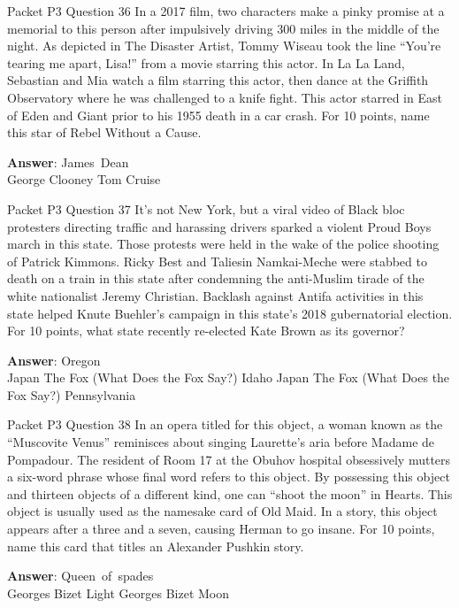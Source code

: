 \begin{frame}{Packet P3 Question 36}
In a 2017 film, two characters make a pinky promise at a memorial to this person after impulsively driving 300 miles in the middle of the night. As depicted in The Disaster Artist, Tommy Wiseau took the line “You’re tearing me apart, Lisa!” from a movie starring this actor. In La La Land, Sebastian and Mia watch a film starring this actor, then dance at the Griffith Observatory where he was challenged to a knife fight. This actor starred in East of Eden and Giant prior to his 1955 death in a car crash. For 10 points, name this star of Rebel Without a Cause.        

\textbf{Answer}: James\ Dean\\
 George Clooney
 Tom Cruise
\end{frame}

\begin{frame}{Packet P3 Question 37}
It's not New York, but   a viral video of Black   bloc protesters directing traffic and harassing drivers sparked a violent Proud Boys march in this state. Those protests were held in the wake of the police shooting of Patrick Kimmons. Ricky Best and Taliesin Namkai-Meche were stabbed to death on a train in this state after condemning the anti-Muslim tirade of the white nationalist Jeremy Christian. Backlash against Antifa activities in this state helped Knute Buehler's campaign in this state's 2018 gubernatorial election. For 10 points, what state recently re-elected Kate Brown as its governor?        

\textbf{Answer}: Oregon\\
 Japan
 The Fox (What Does the Fox Say?)
 Idaho
 Japan
 The Fox (What Does the Fox Say?)
 Pennsylvania
\end{frame}

\begin{frame}{Packet P3 Question 38}
In an opera titled for this object, a woman known as the ``Muscovite Venus'' reminisces about singing Laurette's aria before Madame de Pompadour.   The resident of Room 17 at the Obuhov hospital obsessively mutters a six-word phrase whose final word refers to this object. By possessing this object and thirteen objects of a different kind, one can ``shoot the moon'' in Hearts. This object is usually used as the namesake card of Old Maid. In a story, this object appears after a three and a seven, causing Herman to go insane. For 10 points, name   this card that titles an Alexander Pushkin story.      

\textbf{Answer}: Queen\ of\ spades\\
 Georges Bizet
 Light
 Georges Bizet
 Moon
\end{frame}


